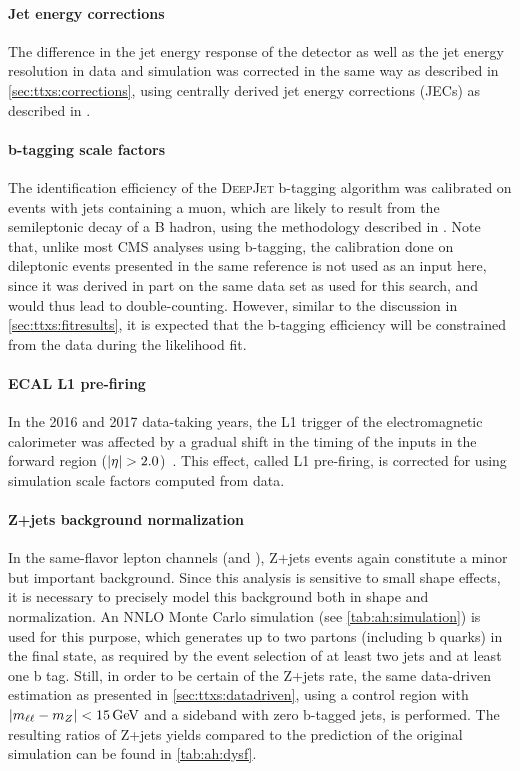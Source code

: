 \paragraph{Jet energy corrections}

The difference in the jet energy response of the detector as well as the jet energy resolution in data and simulation was corrected in the same way as described in \cref{sec:ttxs:corrections}, using centrally derived jet energy corrections (JECs) as described in .

\paragraph{b-tagging scale factors}

The identification efficiency of the \textsc{DeepJet} b-tagging algorithm was calibrated on events with jets containing a muon, which are likely to result from the semileptonic decay of a B hadron, using the methodology described in . Note that, unlike most CMS analyses using b-tagging, the calibration done on dileptonic \ttbar events presented in the same reference is not used as an input here, since it was derived in part on the same data set as used for this search, and would thus lead to double-counting. However, similar to the discussion in \cref{sec:ttxs:fitresults}, it is expected that the b-tagging efficiency will be constrained from the data during the likelihood fit.

\paragraph{ECAL L1 pre-firing}

In the 2016 and 2017 data-taking years, the L1 trigger of the electromagnetic calorimeter was affected by a gradual shift in the timing of the inputs in the forward region ($|\eta| > 2.0$)~\cite{CMS:TRG-17-001}. This effect, called L1 pre-firing, is corrected for using simulation scale factors computed from data.

\paragraph{Z+jets background normalization}

In the same-flavor lepton channels (\ee and \mumu), Z+jets events again constitute a minor but important background. Since this analysis is sensitive to small shape effects, it is necessary to precisely model this background both in shape and normalization. An NNLO Monte Carlo simulation (see \cref{tab:ah:simulation}) is used for this purpose, which generates up to two partons (including b quarks) in the final state, as required by the event selection of at least two jets and at least one b tag. Still, in order to be certain of the Z+jets rate, the same data-driven estimation as presented in \cref{sec:ttxs:datadriven}, using a control region with $|\mll - m_Z| < \SI{15}{\GeV}$ and a sideband with zero b-tagged jets, is performed. The resulting ratios of Z+jets yields compared to the prediction of the original simulation can be found in \cref{tab:ah:dysf}.

